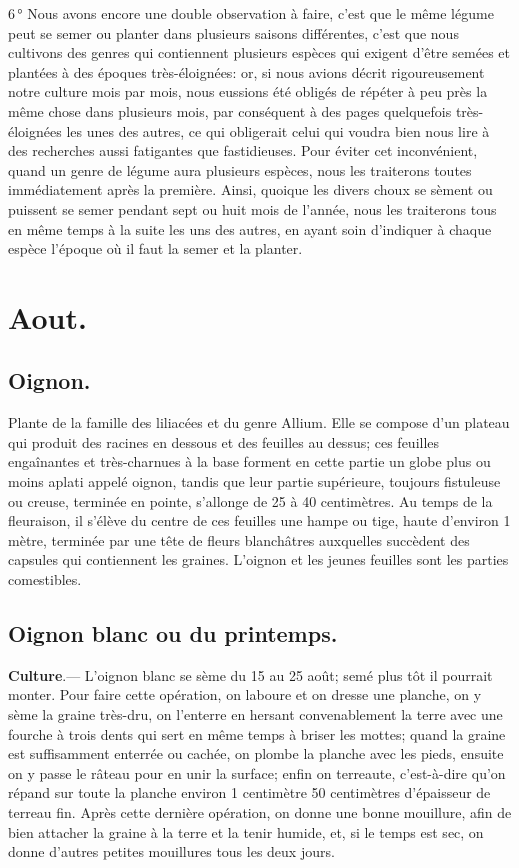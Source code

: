 \documentclass[10pt,a4paper]{book}
\begin{document}
6\,° Nous avons encore une double observation à faire, c'est que le même légume peut se semer ou planter dans plusieurs saisons différentes, c'est que nous cultivons des genres qui contiennent plusieurs espèces qui exigent d'être semées et plantées à des époques très-éloignées: or, si nous avions décrit rigoureusement notre culture mois par mois, nous eussions été obligés de répéter à peu près la même chose dans plusieurs mois, par conséquent à des pages quelquefois très-éloignées les unes des autres, ce qui obligerait celui qui voudra bien nous lire à des recherches aussi fatigantes que fastidieuses. Pour éviter cet inconvénient, quand un genre de légume aura plusieurs espèces, nous les traiterons toutes immédiatement après la première. Ainsi, quoique les divers choux se sèment ou puissent se semer pendant sept ou huit mois de l'année, nous les traiterons tous en même temps à la suite les uns des autres, en ayant soin d'indiquer à chaque espèce l'époque où il faut la semer et la planter.

\section{Aout.}

\subsection{Oignon.}

Plante de la famille des liliacées et du genre Allium. Elle se compose d'un plateau qui produit des racines en dessous et des feuilles au dessus; ces feuilles engaînantes et très-charnues à la base forment en cette partie un globe plus ou moins aplati appelé oignon, tandis que leur partie supérieure, toujours fistuleuse ou creuse, terminée en pointe, s'allonge de 25 à 40 centimètres. Au temps de la fleuraison, il s'élève du centre de ces feuilles une hampe ou tige, haute d'environ 1 mètre, terminée par une tête de fleurs blanchâtres auxquelles succèdent des capsules qui contiennent les graines. L'oignon et les jeunes feuilles sont les parties comestibles.

\subsection{Oignon blanc ou du printemps.}\label{oignonblanc} 

\textbf{Culture}.--- L'oignon blanc se sème du 15 au 25 août; semé plus tôt il pourrait monter. Pour faire cette opération, on laboure et on dresse une planche, on y sème la graine très-dru, on l'enterre en hersant convenablement la terre avec une fourche à trois dents qui sert en même temps à briser les mottes; quand la graine est suffisamment enterrée ou cachée, on plombe la planche avec les pieds, ensuite on y passe le râteau pour en unir la surface; enfin on terreaute, c'est-à-dire qu'on répand sur toute la planche environ 1 centimètre 50 centimètres d'épaisseur de terreau fin. Après cette dernière opération, on donne une bonne mouillure, afin de bien attacher la graine à la terre et la tenir humide, et, si le temps est sec, on donne d'autres petites mouillures tous les deux jours.
\end{document}
